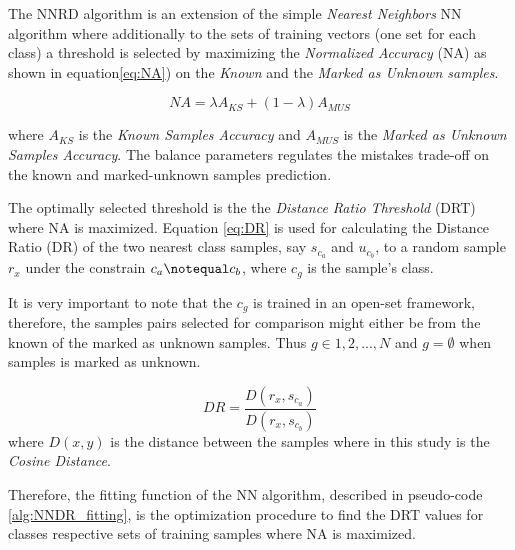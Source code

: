 The NNRD algorithm is an extension of the simple \textit{Nearest Neighbors} NN algorithm where additionally to the sets of training vectors (one set for each class) a threshold is selected by maximizing the \textit{Normalized Accuracy} (NA) as shown in equation\ref{eq:NA}) on the \textit{Known} and the \textit{Marked as Unknown samples}.

\begin{equation} \label{eq:NA}
    NA = \lambda A_{KS} + (1 - \lambda) A_{MUS}
\end{equation}

\noindent
where $A_{KS}$ is the \textit{Known Samples Accuracy} and $A_{MUS}$ is the \textit{Marked as Unknown Samples Accuracy}. The balance parameters \lambda regulates the mistakes trade-off on the known and marked-unknown samples prediction.

The optimally selected threshold is the the \textit{Distance Ratio Threshold} (DRT) where NA is maximized. Equation \ref{eq:DR} is used for calculating the Distance Ratio (DR) of the two nearest class samples, say $s_{c_{a}}$ and $u_{c_{b}}$, to a random sample $r_{x}$ under the constrain $c_{a} \notequal c_{b}$, where $c_{g}$ is the sample's class.

It is very important to note that the $c_{g}$ is trained in an open-set framework, therefore, the samples pairs selected for comparison might either be from the known of the marked as unknown samples. Thus $g \in {1,2,...,N}$ and $g = \emptyset$ when samples is marked as unknown.

\begin{equation} \label{eq:DR}
    DR = \frac{D(r_{x}, s_{c_{a}})}{D(r_{x}, s_{c_{b}})}
\end{equation}
\noindent
where $D(x,y)$ is the distance between the samples where in this study is the \textit{Cosine Distance}.

Therefore, the fitting function of the NN algorithm, described in pseudo-code \ref{alg:NNDR_fitting}, is the optimization procedure to find the DRT values for classes respective sets of training samples where NA is maximized.

\hfill \break

